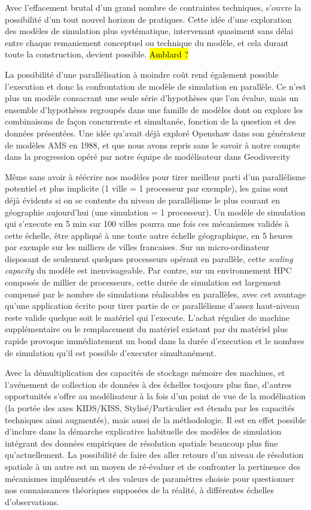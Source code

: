 Avec l'effacement brutal d'un grand nombre de contraintes techniques, s'ouvre la possibilité d'un tout nouvel horizon de pratiques. Cette idée d'une exploration des modèles de simulation plus systématique, intervenant quasiment sans délai entre chaque remaniement conceptuel ou technique du modèle, et cela durant toute la construction, devient possible. \hl{Amblard ?}

La possibilité d'une parallélisation à moindre coût rend également possible l'execution et donc la confrontation de modèle de simulation en parallèle. Ce n'est plus un modèle consacrant une seule série d'hypothèses que l'on évalue, mais un ensemble d'hypothèses regroupés dans une famille de modèles dont on explore les combinaisons de façon concurrente et simultanée, fonction de la question et des données présentées. Une idée qu'avait déjà exploré Openshaw dans son générateur de modèles AMS en 1988, et que nous avons repris sans le savoir à notre compte dans la progression opéré par notre équipe de modélisateur dans Geodivercity \autocite{Cottineau2014b}

Même sans avoir à réécrire nos modèles pour tirer meilleur parti d'un parallélisme potentiel et plus implicite (1 ville = 1 processeur par exemple), les gains sont déjà évidents si on se contente du niveau de parallélisme le plus courant en géographie aujourd'hui (une simulation = 1 processeur). Un modèle de simulation qui s’execute en 5 min sur 100 villes pourra une fois ces mécanismes validés à cette échelle, être appliqué à une toute autre échelle géographique, en 5 heures par exemple sur les milliers de villes francaises. Sur un micro-ordinateur disposant de seulement quelques processeurs opérant en parallèle, cette \textit{scaling capacity} du modèle est inenvisageable. Par contre, sur un environnement HPC composés de millier de processeurs, cette durée de simulation est largement compensé par le nombre de simulations réalisables en parallèles, avec cet avantage qu'une application écrite pour tirer partie de ce parallélisme d'assez haut-niveau reste valide quelque soit le matériel qui l'execute. L'achat régulier de machine supplémentaire ou le remplacement du matériel existant par du matériel plus rapide provoque immédiatement un bond dans la durée d'execution et le nombres de simulation qu'il est possible d'executer simultanément.

Avec la démultiplication des capacités de stockage mémoire des machines, et l'avénement de collection de données à des échelles toujours plus fine, d'autres opportunités s'offre au modélisateur à la fois d'un point de vue de la modélisation (la portée des axes KIDS/KISS, Stylisé/Particulier \autocite{Banos2013a} est étendu par les capacités techniques ainsi augmentés), mais aussi de la méthodologie. Il est en effet possible d'inclure dans la démarche explicative habituelle des modèles de simulation intégrant des données empiriques de résolution spatiale beaucoup plus fine qu'actuellement. La possibilité de faire des aller retours d'un niveau de résolution spatiale à un autre est un moyen de ré-évaluer et de confronter la pertinence des mécanismes implémentés et des valeurs de paramètres choisie pour questionner nos connaissances théoriques supposées de la réalité, à différentes échelles d'observations.

